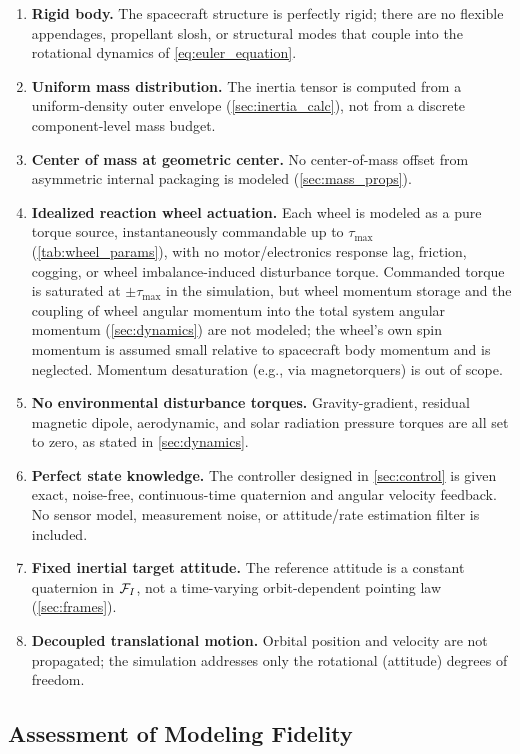 \begin{enumerate}
    \item \textbf{Rigid body.} The spacecraft structure is perfectly rigid; there are no flexible appendages, propellant slosh, or structural modes that couple into the rotational dynamics of \cref{eq:euler_equation}.
    \item \textbf{Uniform mass distribution.} The inertia tensor is computed from a uniform-density outer envelope (\cref{sec:inertia_calc}), not from a discrete component-level mass budget.
    \item \textbf{Center of mass at geometric center.} No center-of-mass offset from asymmetric internal packaging is modeled (\cref{sec:mass_props}).
    \item \textbf{Idealized reaction wheel actuation.} Each wheel is modeled as a pure torque source, instantaneously commandable up to $\tau_{\max}$ (\cref{tab:wheel_params}), with no motor/electronics response lag, friction, cogging, or wheel imbalance-induced disturbance torque. Commanded torque is saturated at $\pm\tau_{\max}$ in the simulation, but wheel momentum storage and the coupling of wheel angular momentum into the total system angular momentum (\cref{sec:dynamics}) are not modeled; the wheel's own spin momentum is assumed small relative to spacecraft body momentum and is neglected. Momentum desaturation (e.g., via magnetorquers) is out of scope.
    \item \textbf{No environmental disturbance torques.} Gravity-gradient, residual magnetic dipole, aerodynamic, and solar radiation pressure torques are all set to zero, as stated in \cref{sec:dynamics}.
    \item \textbf{Perfect state knowledge.} The controller designed in \cref{sec:control} is given exact, noise-free, continuous-time quaternion and angular velocity feedback. No sensor model, measurement noise, or attitude/rate estimation filter is included.
    \item \textbf{Fixed inertial target attitude.} The reference attitude is a constant quaternion in $\mathcal{F}_I$, not a time-varying orbit-dependent pointing law (\cref{sec:frames}).
    \item \textbf{Decoupled translational motion.} Orbital position and velocity are not propagated; the simulation addresses only the rotational (attitude) degrees of freedom.
\end{enumerate}

\subsection{Assessment of Modeling Fidelity}
\label{sec:fidelity_assessment}

